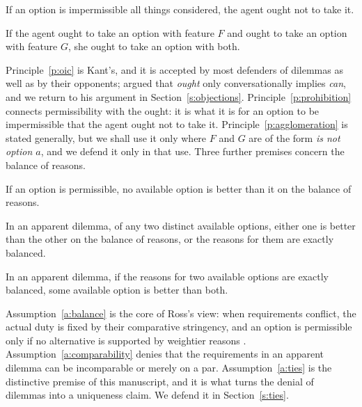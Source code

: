 \documentclass{situationist-preprint}
\begin{document}
\begin{principle}[Prohibition]\label{p:prohibition}
If an option is impermissible all things considered, the agent ought not to take it.
\end{principle}

\begin{principle}\label{p:agglomeration}
If the agent ought to take an option with feature $F$ and ought to take an option with feature $G$, she ought to take an option with both.
\end{principle}

Principle~\ref{p:oic} is Kant's, and it is accepted by most defenders of dilemmas as well as by their opponents; \citet{SinnottArmstrong1984} argued that \emph{ought} only conversationally implies \emph{can}, and we return to his argument in Section~\ref{s:objections}. Principle~\ref{p:prohibition} connects permissibility with the ought: it is what it is for an option to be impermissible that the agent ought not to take it. Principle~\ref{p:agglomeration} is stated generally, but we shall use it only where $F$ and $G$ are of the form \emph{is not option $a$}, and we defend it only in that use. Three further premises concern the balance of reasons.

\begin{assumption}[Balance]\label{a:balance}
If an option is permissible, no available option is better than it on the balance of reasons.
\end{assumption}

\begin{assumption}[Comparability]\label{a:comparability}
In an apparent dilemma, of any two distinct available options, either one is better than the other on the balance of reasons, or the reasons for them are exactly balanced.
\end{assumption}

\begin{assumption}\label{a:ties}
In an apparent dilemma, if the reasons for two available options are exactly balanced, some available option is better than both.
\end{assumption}

Assumption~\ref{a:balance} is the core of Ross's view: when requirements conflict, the actual duty is fixed by their comparative stringency, and an option is permissible only if no alternative is supported by weightier reasons \citep[ch.~2]{Ross1930}. Assumption~\ref{a:comparability} denies that the requirements in an apparent dilemma can be incomparable or merely on a par. Assumption~\ref{a:ties} is the distinctive premise of this manuscript, and it is what turns the denial of dilemmas into a uniqueness claim. We defend it in Section~\ref{s:ties}.
\end{document}
